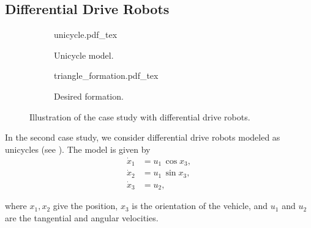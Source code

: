\subsection{Differential Drive Robots}
\begin{figure}[b]
    \centering
    \begin{subfigure}[t]{0.35\textwidth}
        \centering
        \def\svgwidth{0.71\textwidth}
        {unicycle.pdf_tex}
        \vspace*{-1.5mm}
        \caption{Unicycle model.}
        \label{fig:MPC_unicycle}        
        \vspace*{-3mm}
    \end{subfigure}
    \hspace*{0.1\textwidth}
    \begin{subfigure}[t]{0.35\textwidth}
        \centering
        \def\svgwidth{0.71\textwidth}
        {triangle_formation.pdf_tex}
        \vspace*{-1mm}
        \caption{Desired formation.}
        \label{fig:MPC_triangle_formation}
        \vspace*{-3mm}
    \end{subfigure}
    \caption{Illustration of the case study with differential drive robots.}
\end{figure}

In the second case study, we consider differential drive robots modeled as unicycles (see ).
The model is given by
\begin{subequations}
    \begin{align}
        \dot{x}_1 &= u_1\,\cos x_3, \\
        \dot{x}_2 &= u_1\,\sin x_3, \\
        \dot{x}_3 &= u_2,
    \end{align} \label{eq:MPC_unicycle_ode_x} 
\end{subequations}
\vspace*{-1em}

\noindent where $x_1, x_2$ give the position, $x_3$ is the orientation of the vehicle, and $u_1$ and $u_2$ are the tangential and angular velocities.

